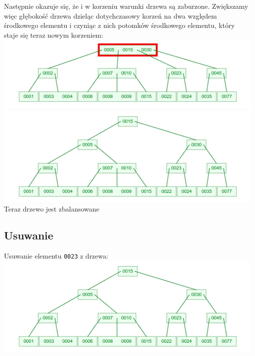 \documentclass[12pt]{article}
\begin{document}
	\noindent Następnie okazuje się, że i w korzeniu warunki drzewa są zaburzone. Zwiększamy więc głębokość drzewa dzieląc dotychczasowy korzeń na dwa względem środkowego elementu i czyniąc z nich potomków środkowego elementu, który staje się teraz nowym korzeniem: \\
	\includegraphics[width=\linewidth]{graphics/b-trees/insert/rebalance-04.png} \\
	\includegraphics[width=\linewidth]{graphics/b-trees/insert/rebalance-05.png} \\

	\noindent Teraz drzewo jest zbalansowane

	\subsection{Usuwanie}
	Usuwanie elementu \texttt{0023} z drzewa: \\
	\includegraphics[width=\linewidth]{graphics/b-trees/delete/begin.png} \\
\end{document}
